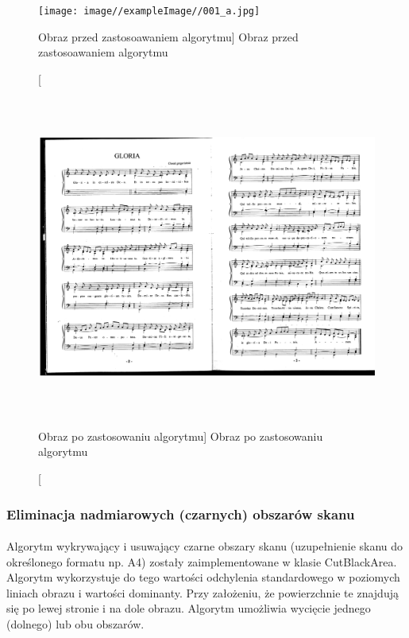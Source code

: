 \documentclass[a4paper,12pt]{article}
\begin{document}
    		    \begin{figure}[!ht]  
    			    \begin{center}
    				    \texttt{[image: image//exampleImage//001\_a.jpg]} 
    			    \end{center}
    			    \caption
        			    [Obraz przed zastosoawaniem algorytmu]  
                        {Obraz przed zastosoawaniem algorytmu}  
    		    \end{figure}
		
		        \begin{figure}[!ht]  
    			    \begin{center}
    				    \includegraphics[height=10.5cm, frame] {image//exampleImage//001_b.png} 
    			    \end{center}
	    		    \caption
    			        [Obraz po zastosowaniu algorytmu]  
	    		        {Obraz po zastosowaniu algorytmu}  
	            \end{figure}
		
		\subsubsection{Eliminacja nadmiarowych (czarnych) obszarów skanu}
			\paragraph{\indent} 
			Algorytm wykrywający i usuwający czarne obszary skanu (uzupełnienie skanu do określonego formatu np. A4) zostały  zaimplementowane w klasie CutBlackArea. Algorytm wykorzystuje do tego           wartości odchylenia standardowego w poziomych liniach obrazu i wartości     dominanty. Przy założeniu, że powierzchnie te znajdują się po lewej         stronie i na dole obrazu. Algorytm umożliwia wycięcie jednego (dolnego)     lub obu obszarów. 
			
\end{document}
